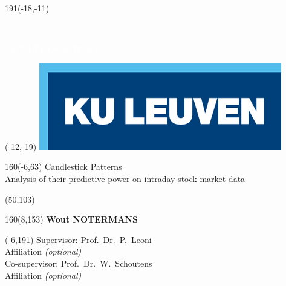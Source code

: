 \documentclass[
  12pt,
  a4paper,
  oneside]{book}
\author{}
\date{\vspace{-2.5em}}
\begin{document}
\thispagestyle{empty}
\newcommand{\form}[1]{\scalebox{1.087}{\boldmath{#1}}}
\sffamily
%
\begin{textblock}{191}(-18,-11)
\colorbox{bluetitle}{\hspace{139mm}\ \parbox[c][18truemm]{52mm}{\textcolor{white}{FACULTY OF SCIENCE}}}
\end{textblock}
%
\begin{textblock}{70}(-12,-19)
\textblockcolour{}
\includegraphics*[height=19.8truemm]{Images/LogoKULeuven}
\end{textblock}
%
\begin{textblock}{160}(-6,63)
\textblockcolour{}
\vspace{-\parskip}
\flushleft
\fontsize{40}{42}\selectfont \textcolor{bluetitle}{Candlestick Patterns}\\[1.5mm]
\fontsize{20}{22}\selectfont Analysis of their predictive power on intraday stock market data
\end{textblock}
%
\begin{textblock}{82}(50,103)
\textblockcolour{}
\vspace{-\parskip}
\flushleft
\end{textblock}
%
\begin{textblock}{160}(8,153)
\textblockcolour{}
\vspace{-\parskip}
\flushright
\fontsize{14}{16}\selectfont \textbf{Wout NOTERMANS}
\end{textblock}
%
\begin{textblock}{70}(-6,191)
\textblockcolour{}
\vspace{-\parskip}
\flushleft
Supervisor: Prof.~Dr.~P.~Leoni\\[-2pt]
\textcolor{blueaff}{Affiliation \textsl{(optional)}}\\[5pt]
Co-supervisor: Prof.~Dr.~W.~Schoutens\\[-2pt]
\textcolor{blueaff}{Affiliation \textsl{(optional)}}\\[5pt]
\end{textblock}
\end{document}
